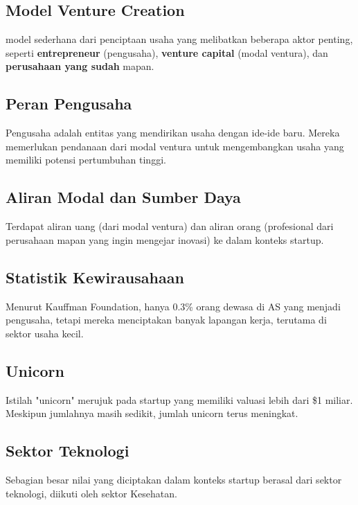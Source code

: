 \documentclass{article}
\begin{document}
\subsection{Model Venture Creation}
model sederhana dari penciptaan usaha yang melibatkan beberapa aktor penting, seperti \textbf{entrepreneur} (pengusaha), \textbf{venture capital} (modal ventura), dan \textbf{perusahaan yang sudah} mapan.

\subsection{Peran Pengusaha}
Pengusaha adalah entitas yang mendirikan usaha dengan ide-ide baru. Mereka memerlukan pendanaan dari modal ventura untuk mengembangkan usaha yang memiliki potensi pertumbuhan tinggi.

\subsection{Aliran Modal dan Sumber Daya}
Terdapat aliran uang (dari modal ventura) dan aliran orang (profesional dari perusahaan mapan yang ingin mengejar inovasi) ke dalam konteks startup.

\subsection{Statistik Kewirausahaan}
Menurut Kauffman Foundation, hanya 0.3\% orang dewasa di AS yang menjadi pengusaha, tetapi mereka menciptakan banyak lapangan kerja, terutama di sektor usaha kecil.

\subsection{Unicorn}
Istilah "unicorn" merujuk pada startup yang memiliki valuasi lebih dari \$1 miliar. Meskipun jumlahnya masih sedikit, jumlah unicorn terus meningkat.

\subsection{Sektor Teknologi}
Sebagian besar nilai yang diciptakan dalam konteks startup berasal dari sektor teknologi, diikuti oleh sektor Kesehatan.
\end{document}
